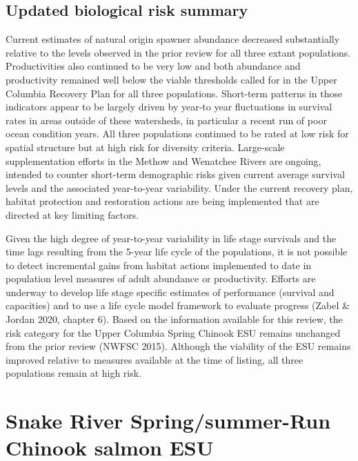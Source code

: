 \documentclass[
  letterpaper,
  oneside,
  open=any]{scrbook}
\begin{document}
\hypertarget{updated-biological-risk-summary-1}{%
\section{Updated biological risk
summary}\label{updated-biological-risk-summary-1}}

Current estimates of natural origin spawner abundance decreased
substantially relative to the levels observed in the prior review for
all three extant populations. Productivities also continued to be very
low and both abundance and productivity remained well below the viable
thresholds called for in the Upper Columbia Recovery Plan for all three
populations. Short-term patterns in those indicators appear to be
largely driven by year-to year fluctuations in survival rates in areas
outside of these watersheds, in particular a recent run of poor ocean
condition years. All three populations continued to be rated at low risk
for spatial structure but at high risk for diversity criteria.
Large-scale supplementation efforts in the Methow and Wenatchee Rivers
are ongoing, intended to counter short-term demographic risks given
current average survival levels and the associated year-to-year
variability. Under the current recovery plan, habitat protection and
restoration actions are being implemented that are directed at key
limiting factors.

Given the high degree of year-to-year variability in life stage
survivals and the time lags resulting from the 5-year life cycle of the
populations, it is not possible to detect incremental gains from habitat
actions implemented to date in population level measures of adult
abundance or productivity. Efforts are underway to develop life stage
specific estimates of performance (survival and capacities) and to use a
life cycle model framework to evaluate progress (Zabel \& Jordan 2020,
chapter 6). Based on the information available for this review, the risk
category for the Upper Columbia Spring Chinook ESU remains unchanged
from the prior review (NWFSC 2015). Although the viability of the ESU
remains improved relative to measures available at the time of listing,
all three populations remain at high risk.


\hypertarget{snake-river-springsummer-run-chinook-salmon-esu}{%
\chapter{Snake River Spring/summer-Run Chinook salmon
ESU}\label{snake-river-springsummer-run-chinook-salmon-esu}}
\end{document}

